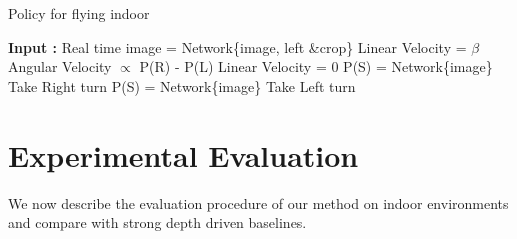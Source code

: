 \documentclass[letterpaper, 10 pt, conference]{ieeeconf}  %
\begin{document}
\begin{algorithm}
\caption{Policy for flying indoor}
\label{test_fly}
\begin{algorithmic}[1]
    \State \textbf{Input : } Real time image
     = Network\{image, left \&\right crop\}
        \State Linear Velocity = $\beta$
        \State Angular Velocity $\propto$ P(R) - P(L)
    \Else
        \State Linear Velocity = 0
                \State P(S) = Network\{image\}
                \State Take Right turn
        \EndWhile
        \Else
            \State P(S) = Network\{image\}
            \State Take Left turn
        \EndWhile
        \EndIf 
    \EndIf
\EndWhile

\end{algorithmic}
\end{algorithm}
\section{Experimental Evaluation}
We now describe the evaluation procedure of our method on indoor environments and compare with strong depth driven baselines. 
\end{document}
